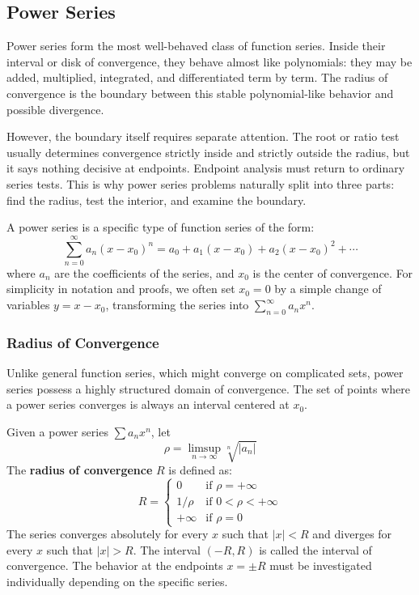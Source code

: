 \subsection{Power Series}


Power series form the most well-behaved class of function series. Inside their interval or disk of convergence, they behave almost like polynomials: they may be added, multiplied, integrated, and differentiated term by term. The radius of convergence is the boundary between this stable polynomial-like behavior and possible divergence.

However, the boundary itself requires separate attention. The root or ratio test usually determines convergence strictly inside and strictly outside the radius, but it says nothing decisive at endpoints. Endpoint analysis must return to ordinary series tests. This is why power series problems naturally split into three parts: find the radius, test the interior, and examine the boundary.

A power series is a specific type of function series of the form:
\[ \sum_{n=0}^{\infty} a_n (x - x_0)^n = a_0 + a_1(x - x_0) + a_2(x - x_0)^2 + \cdots \]
where $a_n$ are the coefficients of the series, and $x_0$ is the center of convergence. For simplicity in notation and proofs, we often set $x_0 = 0$ by a simple change of variables $y = x - x_0$, transforming the series into $\sum_{n=0}^{\infty} a_n x^n$.

\subsubsection{Radius of Convergence}

Unlike general function series, which might converge on complicated sets, power series possess a highly structured domain of convergence. The set of points where a power series converges is always an interval centered at $x_0$.


\begin{theorem}
Given a power series $\sum a_n x^n$, let
\[ \rho = \limsup_{n \to \infty} \sqrt[n]{|a_n|} \]
The \textbf{radius of convergence} $R$ is defined as:
\[ R = \begin{cases} 0 & \text{if } \rho = +\infty \\ 1/\rho & \text{if } 0 < \rho < +\infty \\ +\infty & \text{if } \rho = 0 \end{cases} \]
The series converges absolutely for every $x$ such that $|x| < R$ and diverges for every $x$ such that $|x| > R$. The interval $(-R, R)$ is called the interval of convergence. The behavior at the endpoints $x = \pm R$ must be investigated individually depending on the specific series.
\end{theorem}

